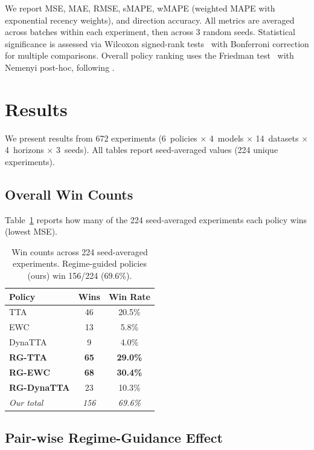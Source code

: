 \documentclass[11pt,a4paper]{article}
\begin{document}
We report MSE, MAE, RMSE, sMAPE, wMAPE (weighted MAPE with exponential recency weights), and direction accuracy. All metrics are averaged across batches within each experiment, then across 3 random seeds. Statistical significance is assessed via Wilcoxon signed-rank tests~\citep{wilcoxon1945} with Bonferroni correction for multiple comparisons. Overall policy ranking uses the Friedman test~\citep{friedman1937} with Nemenyi post-hoc, following \citet{demsar2006statistical}.


\section{Results}
\label{sec:results}

We present results from 672 experiments (6~policies $\times$ 4~models $\times$ 14~datasets $\times$ 4~horizons $\times$ 3~seeds). All tables report seed-averaged values (224 unique experiments).

\subsection{Overall Win Counts}

Table~\ref{tab:wins} reports how many of the 224 seed-averaged experiments each policy wins (lowest MSE).

\begin{table}[t]
\centering
\caption{Win counts across 224 seed-averaged experiments. Regime-guided policies (ours) win 156/224 (69.6\%).}
\label{tab:wins}
\small
\begin{tabular}{lcc}
\toprule
Policy & Wins & Win Rate \\
\midrule
TTA & 46 & 20.5\% \\
EWC & 13 & 5.8\% \\
DynaTTA & 9 & 4.0\% \\
\midrule
\textbf{RG-TTA} & \textbf{65} & \textbf{29.0\%} \\
\textbf{RG-EWC} & \textbf{68} & \textbf{30.4\%} \\
\textbf{RG-DynaTTA} & 23 & 10.3\% \\
\midrule
\emph{Our total} & \emph{156} & \emph{69.6\%} \\
\bottomrule
\end{tabular}
\end{table}

\subsection{Pair-wise Regime-Guidance Effect}
\end{document}
